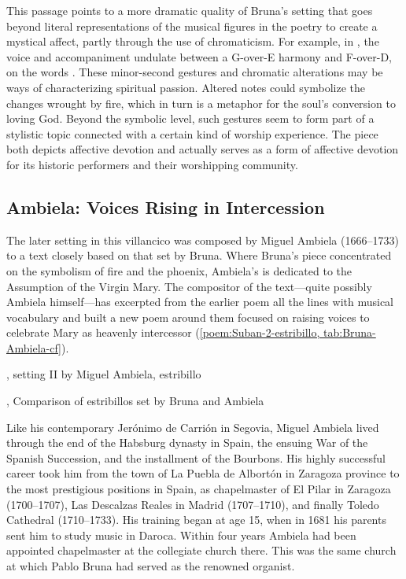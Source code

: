 This passage points to a more dramatic quality of Bruna's setting that goes
beyond literal representations of the musical figures in the poetry to create a
mystical affect, partly through the use of chromaticism.
For example, in , the voice and accompaniment undulate between a
G-over-E\fl{} harmony and F\sh-over-D, on the words .
These minor-second gestures and chromatic alterations may be
ways of characterizing spiritual passion.
Altered notes could symbolize the changes wrought by fire, which in turn is a
metaphor for the soul's conversion to loving God.  
Beyond the symbolic level, such gestures seem to form part of a stylistic topic
connected with a certain kind of worship experience.  
The piece both depicts affective devotion and actually serves as a form of
affective devotion for its historic performers and their worshipping community.


\subsection{Ambiela: Voices Rising in Intercession}

The later setting in this villancico was composed by Miguel Ambiela
(1666--1733) to a text closely based on that set by Bruna.
Where Bruna's piece concentrated on the symbolism of fire and the phoenix,
Ambiela's is dedicated to the Assumption of the Virgin Mary.
The compositor of the text---quite possibly Ambiela himself---has excerpted
from the earlier poem all the lines with musical vocabulary and built a new
poem around them focused on raising voices to celebrate Mary as heavenly
intercessor (\cref{poem:Suban-2-estribillo, tab:Bruna-Ambiela-cf}).

{, setting II by Miguel Ambiela, estribillo}

{, Comparison of estribillos set by Bruna and Ambiela}

Like his contemporary Jerónimo de Carrión in Segovia, Miguel Ambiela lived
through the end of the Habsburg dynasty in Spain, the ensuing War of the
Spanish Succession, and the installment of the Bourbons.
His highly successful career took him from the town of La Puebla de Albortón in
Zaragoza province to the most prestigious positions in Spain, as chapelmaster
of El Pilar in Zaragoza (1700--1707), Las Descalzas Reales in Madrid
(1707--1710), and finally Toledo Cathedral (1710--1733).%
    \Autocites
    [1]{Calahorra:Suban}
    []{Grove}
    {Alvarez:Ambiela}
His training began at age 15, when in 1681 his parents sent him to study music
in Daroca.
Within four years Ambiela had been appointed chapelmaster at the collegiate
church there.
This was the same church at which Pablo Bruna had served as the renowned
organist.

